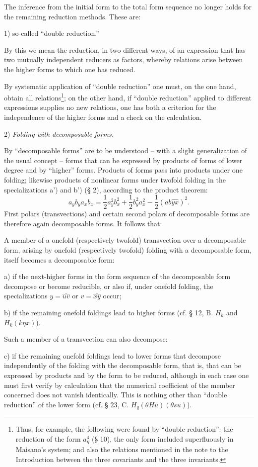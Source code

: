 \documentclass[11pt]{article}
\begin{document}
The inference from the initial form to the total form sequence no longer holds for the remaining reduction methods. These are:

1) so-called ``double reduction.''

By this we mean the reduction, in two different ways, of an expression that has two mutually independent reducers as factors, whereby relations arise between the higher forms to which one has reduced.

By systematic application of ``double reduction'' one must, on the one hand, obtain all relations\footnote{Thus, for example, the following were found by ``double reduction'': the reduction of the form $a_\eta^4$ (§ 10), the only form included superfluously in Maisano's system; and also the relations mentioned in the note to the Introduction between the three covariants and the three invariants.}; on the other hand, if ``double reduction'' applied to different expressions supplies no new relations, one has both a criterion for the independence of the higher forms and a check on the calculation.

2) \emph{Folding with decomposable forms.}

By ``decomposable forms'' are to be understood -- with a slight generalization of the usual concept -- forms that can be expressed by products of forms of lower degree and by ``higher'' forms. Products of forms pass into products under one folding; likewise products of nonlinear forms under twofold folding in the specializations a') and b') (§ 2), according to the product theorem:
\[
a_yb_y a_xb_x=\frac12a_y^2b_x^2+\frac12b_y^2a_x^2-\frac12(ab\widehat{yx})^2.
\]
First polars (transvections) and certain second polars of decomposable forms are therefore again decomposable forms. It follows that:

A member of a onefold (respectively twofold) transvection over a decomposable form, arising by onefold (respectively twofold) folding with a decomposable form, itself becomes a decomposable form:

a) if the next-higher forms in the form sequence of the decomposable form decompose or become reducible, or also if, under onefold folding, the specializations $y=\widehat{uv}$ or $v=\widehat{xy}$ occur;

b) if the remaining onefold foldings lead to higher forms (cf. § 12, B. $H_k$ and $H_k(k\eta x)$).

Such a member of a transvection can also decompose:

c) if the remaining onefold foldings lead to lower forms that decompose independently of the folding with the decomposable form, that is, that can be expressed by products and by the form to be reduced, although in each case one must first verify by calculation that the numerical coefficient of the member concerned does not vanish identically. This is nothing other than ``double reduction'' of the lower form (cf. § 23, C. $H_q(\theta H u)(\theta s u)$).
\end{document}
